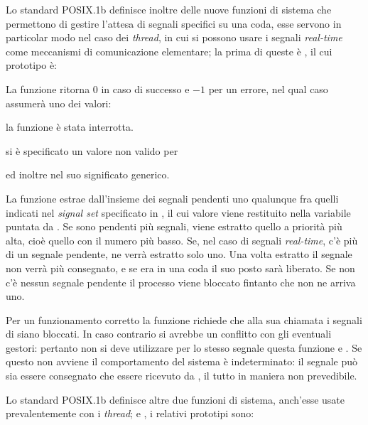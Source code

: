 Lo standard POSIX.1b definisce inoltre delle nuove funzioni di sistema che
permettono di gestire l'attesa di segnali specifici su una coda, esse servono
in particolar modo nel caso dei \textit{thread}, in cui si possono usare i
segnali \textit{real-time} come meccanismi di comunicazione elementare; la
prima di queste è , il cui prototipo è:

\begin{funcproto}{
}
{La funzione ritorna $0$ in caso di successo e $-1$ per un errore, nel qual
  caso  assumerà uno dei valori: 
  \begin{errlist}
  \item[\errcode{EINTR}] la funzione è stata interrotta.
  \item[\errcode{EINVAL}] si è specificato un valore non valido per
  \end{errlist}
  ed inoltre  nel suo significato generico.}
\end{funcproto}

La funzione estrae dall'insieme dei segnali pendenti uno qualunque fra quelli
indicati nel \textit{signal set} specificato in , il cui valore
viene restituito nella variabile puntata da .  Se sono pendenti più
segnali, viene estratto quello a priorità più alta, cioè quello con il numero
più basso. Se, nel caso di segnali \textit{real-time}, c'è più di un segnale
pendente, ne verrà estratto solo uno. Una volta estratto il segnale non verrà
più consegnato, e se era in una coda il suo posto sarà liberato. Se non c'è
nessun segnale pendente il processo viene bloccato fintanto che non ne arriva
uno.

Per un funzionamento corretto la funzione richiede che alla sua chiamata i
segnali di  siano bloccati. In caso contrario si avrebbe un
conflitto con gli eventuali gestori: pertanto non si deve utilizzare per
lo stesso segnale questa funzione e . Se questo non avviene il
comportamento del sistema è indeterminato: il segnale può sia essere
consegnato che essere ricevuto da , il tutto in maniera non
prevedibile.

Lo standard POSIX.1b definisce altre due funzioni di sistema, anch'esse usate
prevalentemente con i \textit{thread};  e
, i relativi prototipi sono:

